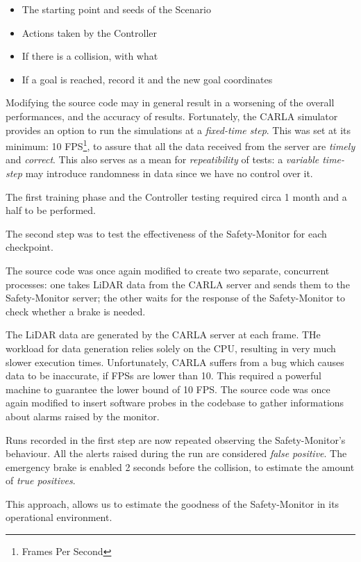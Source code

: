\begin{itemize}
	\item The starting point and seeds of the Scenario
	\item Actions taken by the Controller
	\item If there is a collision, with what
	\item If a goal is reached, record it and the new goal coordinates
\end{itemize}

Modifying the source code may in general result in a worsening of the overall performances, and the accuracy of results. Fortunately, the CARLA simulator provides an option to run the simulations at a \textsl{fixed-time step}. This was set at its minimum: 10 FPS\footnote{Frames Per Second}, to assure that all the data received from the server are \textsl{timely} and \textsl{correct}. This also serves as a mean for \textsl{repeatibility} of tests: a \textsl{variable time-step} may introduce randomness in data since we have no control over it.

The first training phase and the Controller testing required circa 1 month and a half to be performed.\newline

The second step was to test the effectiveness of the Safety-Monitor for each checkpoint.

The source code was once again modified to create two separate, concurrent processes: one takes LiDAR data from the CARLA server and sends them to the Safety-Monitor server; the other waits for the response of the Safety-Monitor to check whether a brake is needed.

The LiDAR data are generated by the CARLA server at each frame. THe workload for data generation relies solely on the CPU, resulting in very much slower execution times. Unfortunately, CARLA suffers from a bug which causes data to be inaccurate, if FPSs are lower than 10. This required a powerful machine to guarantee the lower bound of 10 FPS.
The source code was once again modified to insert software probes in the codebase to gather informations about alarms raised by the monitor.

Runs recorded in the first step are now repeated observing the Safety-Monitor's behaviour. All the alerts raised during the run are considered \textsl{false positive}. The emergency brake is enabled 2 seconds before the collision, to estimate the amount of \textsl{true positives}.

This approach, allows us to estimate the goodness of the Safety-Monitor in its operational environment.\newline

